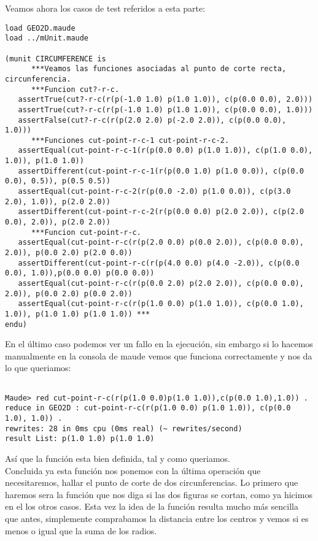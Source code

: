 Veamos ahora los casos de test referidos a esta parte:

\begin{verbatim}
load GEO2D.maude
load ../mUnit.maude

(munit CIRCUMFERENCE is 
      ***Veamos las funciones asociadas al punto de corte recta, circunferencia.
      ***Funcion cut?-r-c.
   assertTrue(cut?-r-c(r(p(-1.0 1.0) p(1.0 1.0)), c(p(0.0 0.0), 2.0)))
   assertTrue(cut?-r-c(r(p(-1.0 1.0) p(1.0 1.0)), c(p(0.0 0.0), 1.0)))
   assertFalse(cut?-r-c(r(p(2.0 2.0) p(-2.0 2.0)), c(p(0.0 0.0), 1.0)))
      ***Funciones cut-point-r-c-1 cut-point-r-c-2.
   assertEqual(cut-point-r-c-1(r(p(0.0 0.0) p(1.0 1.0)), c(p(1.0 0.0), 1.0)), p(1.0 1.0))
   assertDifferent(cut-point-r-c-1(r(p(0.0 1.0) p(1.0 0.0)), c(p(0.0 0.0), 0.5)), p(0.5 0.5))
   assertEqual(cut-point-r-c-2(r(p(0.0 -2.0) p(1.0 0.0)), c(p(3.0 2.0), 1.0)), p(2.0 2.0))
   assertDifferent(cut-point-r-c-2(r(p(0.0 0.0) p(2.0 2.0)), c(p(2.0 0.0), 2.0)), p(2.0 2.0))
      ***Funcion cut-point-r-c.
   assertEqual(cut-point-r-c(r(p(2.0 0.0) p(0.0 2.0)), c(p(0.0 0.0), 2.0)), p(0.0 2.0) p(2.0 0.0))
   assertDifferent(cut-point-r-c(r(p(4.0 0.0) p(4.0 -2.0)), c(p(0.0 0.0), 1.0)),p(0.0 0.0) p(0.0 0.0))
   assertEqual(cut-point-r-c(r(p(0.0 2.0) p(2.0 2.0)), c(p(0.0 0.0), 2.0)), p(0.0 2.0) p(0.0 2.0))
   assertEqual(cut-point-r-c(r(p(1.0 0.0) p(1.0 1.0)), c(p(0.0 1.0), 1.0)), p(1.0 1.0) p(1.0 1.0)) *** 
endu)
\end{verbatim}

En el \'ultimo caso podemos ver un fallo en la ejecuci\'on, sin embargo si lo hacemos manualmente en la consola de maude vemos que funciona correctamente y nos da lo que queriamos:

\begin{verbatim}

Maude> red cut-point-r-c(r(p(1.0 0.0)p(1.0 1.0)),c(p(0.0 1.0),1.0)) .
reduce in GEO2D : cut-point-r-c(r(p(1.0 0.0) p(1.0 1.0)), c(p(0.0 1.0), 1.0)) .
rewrites: 28 in 0ms cpu (0ms real) (~ rewrites/second)
result List: p(1.0 1.0) p(1.0 1.0)

\end{verbatim}

As\'i que la funci\'on esta bien definida, tal y como queriamos. \\

Concluida ya esta funci\'on nos ponemos con la \'ultima operaci\'on que necesitaremos, hallar el punto de corte de dos circunferencias. Lo primero que haremos sera la funci\'on que nos diga si las dos figuras se cortan, como ya hicimos en el los otros casos. Esta vez la idea de la funci\'on resulta mucho m\'as sencilla que antes, simplemente comprabamos la distancia entre los centros y vemos si es menos o igual que la suma de los radios. \par


